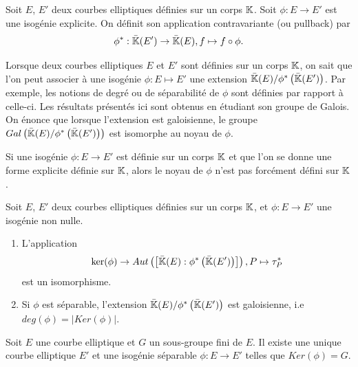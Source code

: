 \begin{Def}
	Soit $E$, $E'$ deux courbes elliptiques définies sur un corps $\mathbb{K}$. Soit $\phi : E\rightarrow E'$ est une isogénie explicite. On définit son application contravariante (ou pullback) par
	\begin{equation*}
		\phi^{*} : \bar{\mathbb{K}}(E') \rightarrow \bar{\mathbb{K}}(E), f\mapsto f\circ\phi.
	\end{equation*} 
\end{Def}

Lorsque deux courbes elliptiques $E$ et $E'$ sont définies sur un corps $\mathbb{K}$, on sait que l'on peut associer à une isogénie $\phi : E\mapsto E'$ une extension $\bar{\mathbb{K}}(E)/\phi^{*}\left( \bar{\mathbb{K}}(E')\right)$. Par exemple, les notions de degré ou de séparabilité de $\phi$ sont définies par rapport à celle-ci. Les résultats présentés ici sont obtenus en étudiant son groupe de Galois. On énonce que lorsque l'extension est galoisienne, le groupe $Gal\left( \bar{\mathbb{K}}(E)/\phi^{*}\left( \bar{\mathbb{K}}(E')\right)\right)$ est isomorphe au noyau de $\phi$.

\begin{Rem}
	Si une isogénie $\phi : E\rightarrow E'$ est définie sur un corps $\mathbb{K}$ et que l'on se donne une forme explicite définie sur $\mathbb{K}$, alors le noyau de $\phi$ n'est pas forcément défini sur $\mathbb{K}$.
\end{Rem}

\begin{The}
	
	Soit $E$, $E'$ deux courbes elliptiques définies sur un corps $\mathbb{K}$, et $\phi : E\rightarrow E'$ une isogénie non nulle. 
	\begin{enumerate}
		\item L'application 
		\begin{equation*}
			\ker(\phi) \rightarrow Aut\left( \left[ \bar{\mathbb{K}}(E) : \phi^{*}\left( \bar{\mathbb{K}}(E')\right) \right] \right) , P\mapsto \tau_{P}^{*}
		\end{equation*} 
		est un isomorphisme.
		\item Si $\phi$ est séparable, l'extension $\bar{\mathbb{K}}(E)/\phi^{*}\left( \bar{\mathbb{K}}(E')\right)$ est galoisienne, i.e $deg(\phi) = |Ker(\phi)|$.
	\end{enumerate}
\end{The}

\begin{Coro}\label{unicitéIsogénieIso}
	Soit $E$ une courbe elliptique et $G$ un sous-groupe fini de $E$. Il existe une unique courbe elliptique $E'$ et une isogénie séparable $\phi : E \rightarrow E'$ telles que $Ker(\phi) = G$.
\end{Coro}

